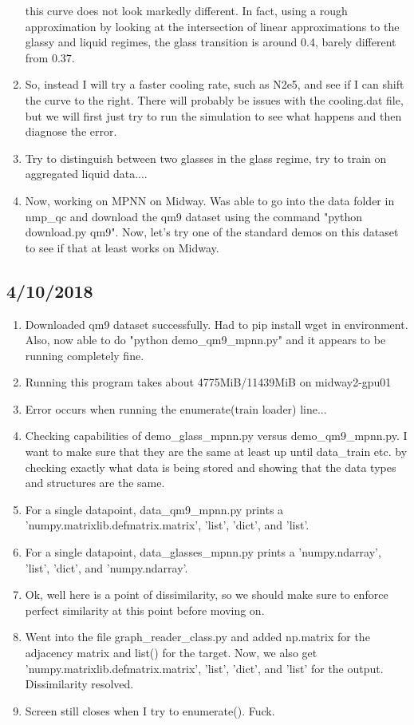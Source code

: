 \documentclass[12pt,reqno]{amsart}
\numberwithin{equation}{section}
\begin{document}
\begin{enumerate}
this curve does not look markedly different.  In fact, using a rough approximation by looking at the intersection of linear approximations to the glassy and liquid regimes, the glass transition is around 0.4, barely different from 0.37.  
\item So, instead I will try a faster cooling rate, such as N2e5, and see if I can shift the curve to the right.  There will probably be issues with the cooling.dat file, but we will first just try to run the simulation to see what happens and then diagnose the error.  

\item Try to distinguish between two glasses in the glass regime, try to train on aggregated liquid data.... 


\item Now, working on MPNN on Midway.  Was able to go into the data folder in nmp\_qc and download the qm9 dataset using the command "python download.py qm9".  Now, let's try one of the standard demos on this dataset to see if that at least works on Midway. 

 
\end{enumerate}

\subsection{4/10/2018}
\begin{enumerate}
\item Downloaded qm9 dataset successfully.  Had to pip install wget in environment.  Also, now able to do "python demo\_qm9\_mpnn.py" and it appears to be running completely fine.  
\item Running this program takes about 4775MiB/11439MiB on midway2-gpu01
\item Error occurs when running the enumerate(train loader) line...


\item Checking capabilities of demo\_glass\_mpnn.py versus demo\_qm9\_mpnn.py.  I want to make sure that they are the same at least up until data\_train etc. by checking exactly what data is being stored and showing that the data types and structures are the same.  
\item For a single datapoint, data\_qm9\_mpnn.py prints a 'numpy.matrixlib.defmatrix.matrix', 'list', 'dict', and 'list'.  
\item For a single datapoint, data\_glasses\_mpnn.py prints a 'numpy.ndarray', 'list', 'dict', and 'numpy.ndarray'.
\item Ok, well here is a point of dissimilarity, so we should make sure to enforce perfect similarity at this point before moving on.  
\item Went into the file graph\_reader\_class.py and added np.matrix for the adjacency matrix and list() for the target.  Now, we also get 'numpy.matrixlib.defmatrix.matrix', 'list', 'dict', and 'list' for the output.  Dissimilarity resolved. 
\item Screen still closes when I try to enumerate().  Fuck.  
\end{enumerate}
\end{document}

